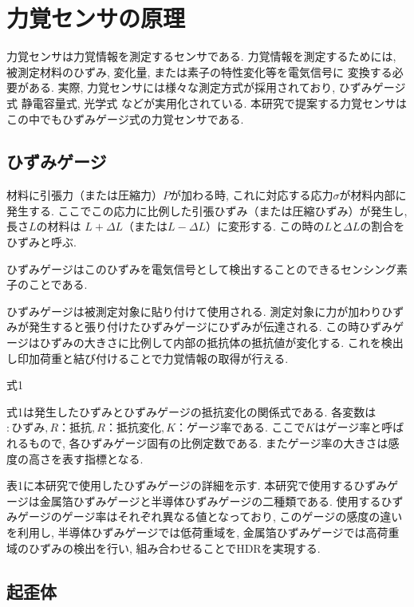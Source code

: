 \section{力覚センサの原理}
力覚センサは力覚情報を測定するセンサである. 
力覚情報を測定するためには, 被測定材料のひずみ, 変化量, または素子の特性変化等を電気信号に
変換する必要がある. 
実際, 力覚センサには様々な測定方式が採用されており, 
ひずみゲージ式\cite{yoshikawa1989six}%
静電容量式\cite{Beyeler2009}, 
光学式\cite{Kim2013a}%
などが実用化されている.
本研究で提案する力覚センサはこの中でもひずみゲージ式の力覚センサである. 

\subsection{ひずみゲージ}
材料に引張力（または圧縮力）$P$が加わる時, これに対応する応力$σ$が材料内部に発生する.
ここでこの応力に比例した引張ひずみ（または圧縮ひずみ）が発生し, 長さ$L$の材料は
$L + \Delta L$（または$L - \Delta L$）に変形する. 
この時の$L$と$\Delta L$の割合をひずみと呼ぶ. 

ひずみゲージはこのひずみを電気信号として検出することのできるセンシング素子のことである. 

ひずみゲージは被測定対象に貼り付けて使用される. 
測定対象に力が加わりひずみが発生すると張り付けたひずみゲージにひずみが伝達される. 
この時ひずみゲージはひずみの大きさに比例して内部の抵抗体の抵抗値が変化する. 
これを検出し印加荷重と結び付けることで力覚情報の取得が行える. 

式1

式1は発生したひずみとひずみゲージの抵抗変化の関係式である. 
各変数は $:ひずみ, R：抵抗, R：抵抗変化, K：ゲージ率$である. 
ここで$K$はゲージ率と呼ばれるもので, 各ひずみゲージ固有の比例定数である. 
またゲージ率の大きさは感度の高さを表す指標となる. 

表1に本研究で使用したひずみゲージの詳細を示す. 
本研究で使用するひずみゲージは金属箔ひずみゲージと半導体ひずみゲージの二種類である. 
使用するひずみゲージのゲージ率はそれぞれ異なる値となっており,  
このゲージの感度の違いを利用し, 半導体ひずみゲージでは低荷重域を, 
金属箔ひずみゲージでは高荷重域のひずみの検出を行い, 
組み合わせることでHDRを実現する. 

\subsection{起歪体}




